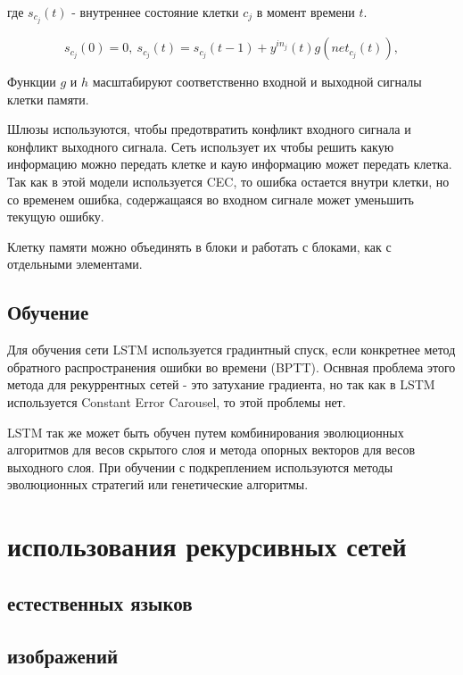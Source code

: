 \documentclass[14pt]{article}
\begin{document}
где $s_{c_j}(t)$ - внутреннее состояние клетки $c_j$ в момент времени $t$.

\begin{equation}
s_{c_j}(0) = 0,~s_{c_j}(t) = s_{c_j}(t - 1) + y^{in_j}(t)g(net_{c_j}(t)),\nonumber
\end{equation}

Функции $g$ и $h$ масштабируют соответственно входной и выходной сигналы клетки памяти.


Шлюзы используются, чтобы предотвратить конфликт входного сигнала  и конфликт выходного сигнала. Сеть использует их чтобы решить какую информацию можно передать клетке и каую информацию может передать клетка. Так как в этой модели используется CEC, то ошибка остается внутри клетки, но со временем ошибка, содержащаяся во входном сигнале может уменьшить текущую ошибку.


Клетку памяти можно объединять в блоки и работать с блоками, как с отдельными элементами.

\subsection{Обучение}
Для обучения сети LSTM используется градинтный спуск, если конкретнее метод обратного распространения ошибки во времени (BPTT). Оснвная проблема этого метода для рекуррентных сетей - это затухание градиента, но так как в LSTM используется Constant Error Carousel, то этой проблемы нет.


LSTM так же может быть обучен путем комбинирования эволюционных алгоритмов для весов скрытого слоя и метода опорных векторов для весов выходного слоя. При обучении с подкреплением используются методы эволюционных стратегий или генетические алгоритмы.


\section{ использования рекурсивных сетей}

\subsection{ естественных языков}

\subsection{ изображений}


\section{}
\end{document}
